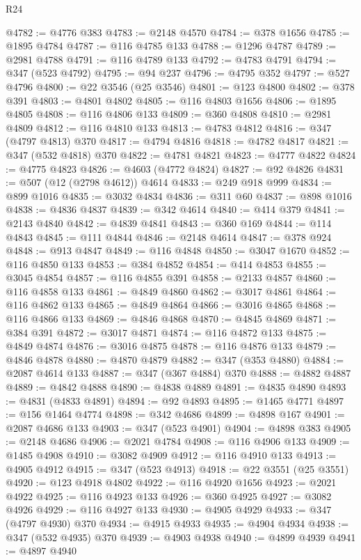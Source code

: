 \begin{lexlean}{R24}
\begin{coremodule}
{{{{{{{{{{{{{{{{{{{{{{{{{{{{{{{{{{{{{{{{{{{{{{{{{{{{{{{{{{{{{{{{{{{{{{{{{{{{{{{{{{{{{{{{{{{{{{{{{{{{{{{{{{{{{{{{{{{{{{{{{{{{{{{{{{{{{{{{{{{{{{{{{{{{{{{{{{{{{{{{{{{{{{{{{{{{{{{{{{{{{{{{{{{{{{{{{{{@4782 := @4776 @383
@4783 := @2148 @4570
@4784 := @378 @1656
@4785 := @1895 @4784
@4787 := @116 @4785 @133
@4788 := @1296 @4787
@4789 := @2981 @4788
@4791 := @116 @4789 @133
@4792 := @4783 @4791
@4794 := @347 (@523 @4792)
@4795 := @94 @237
@4796 := @4795 @352
@4797 := @527 @4796
@4800 := @22 @3546 (@25 @3546)
@4801 := @123 @4800
@4802 := @378 @391
@4803 := @4801 @4802
@4805 := @116 @4803 @1656
@4806 := @1895 @4805
@4808 := @116 @4806 @133
@4809 := @360 @4808
@4810 := @2981 @4809
@4812 := @116 @4810 @133
@4813 := @4783 @4812
@4816 := @347 (@4797 @4813) @370
@4817 := @4794 @4816
@4818 := @4782 @4817
@4821 := @347 (@532 @4818) @370
@4822 := @4781 @4821
@4823 := @4777 @4822
@4824 := @4775 @4823
@4826 := @4603 (@4772 @4824)
@4827 := @92 @4826
@4831 := @507 (@12 (@2798 @4612)) @4614
@4833 := @249 @918 @999
@4834 := @899 @1016
@4835 := @3032 @4834
@4836 := @311 @60
@4837 := @898 @1016
@4838 := @4836 @4837
@4839 := @342 @4614
@4840 := @414 @379
@4841 := @2143 @4840
@4842 := @4839 @4841
@4843 := @360 @169
@4844 := @114 @4843
@4845 := @111 @4844
@4846 := @2148 @4614
@4847 := @378 @924
@4848 := @913 @4847
@4849 := @116 @4848
@4850 := @3047 @1670
@4852 := @116 @4850 @133
@4853 := @384 @4852
@4854 := @414 @4853
@4855 := @3045 @4854
@4857 := @116 @4855 @391
@4858 := @2133 @4857
@4860 := @116 @4858 @133
@4861 := @4849 @4860
@4862 := @3017 @4861
@4864 := @116 @4862 @133
@4865 := @4849 @4864
@4866 := @3016 @4865
@4868 := @116 @4866 @133
@4869 := @4846 @4868
@4870 := @4845 @4869
@4871 := @384 @391
@4872 := @3017 @4871
@4874 := @116 @4872 @133
@4875 := @4849 @4874
@4876 := @3016 @4875
@4878 := @116 @4876 @133
@4879 := @4846 @4878
@4880 := @4870 @4879
@4882 := @347 (@353 @4880)
@4884 := @2087 @4614 @133
@4887 := @347 (@367 @4884) @370
@4888 := @4882 @4887
@4889 := @4842 @4888
@4890 := @4838 @4889
@4891 := @4835 @4890
@4893 := @4831 (@4833 @4891)
@4894 := @92 @4893
@4895 := @1465 @4771
@4897 := @156 @1464 @4774
@4898 := @342 @4686
@4899 := @4898 @167
@4901 := @2087 @4686 @133
@4903 := @347 (@523 @4901)
@4904 := @4898 @383
@4905 := @2148 @4686
@4906 := @2021 @4784
@4908 := @116 @4906 @133
@4909 := @1485 @4908
@4910 := @3082 @4909
@4912 := @116 @4910 @133
@4913 := @4905 @4912
@4915 := @347 (@523 @4913)
@4918 := @22 @3551 (@25 @3551)
@4920 := @123 @4918 @4802
@4922 := @116 @4920 @1656
@4923 := @2021 @4922
@4925 := @116 @4923 @133
@4926 := @360 @4925
@4927 := @3082 @4926
@4929 := @116 @4927 @133
@4930 := @4905 @4929
@4933 := @347 (@4797 @4930) @370
@4934 := @4915 @4933
@4935 := @4904 @4934
@4938 := @347 (@532 @4935) @370
@4939 := @4903 @4938
@4940 := @4899 @4939
@4941 := @4897 @4940
}}}}}}}}}}}}}}}}}}}}}}}}}}}}}}}}}}}}}}}}}}}}}}}}}}}}}}}}}}}}}}}}}}}}}}}}}}}}}}}}}}}}}}}}}}}}}}}}}}}}}}}}}}}}}}}}}}}}}}}}}}}}}}}}}}}}}}}}}}}}}}}}}}}}}}}}}}}}}}}}}}}}}}}}}}}}}}}}}}}}}}}}}}}}}}}}}}}
\end{coremodule}
\end{lexlean}
